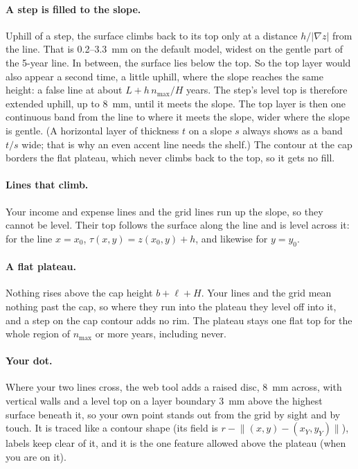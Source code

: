 \documentclass[11pt,letterpaper]{article}
\begin{document}
\paragraph{A step is filled to the slope.} Uphill of a step, the surface climbs back to its top only at a distance $h/|\nabla z|$ from the line. That is 0.2--3.3~mm on the default model, widest on the gentle part of the 5-year line. In between, the surface lies below the top. So the top layer would also appear a second time, a little uphill, where the slope reaches the same height: a false line at about $L + h\,n_{\max}/H$ years. The step's level top is therefore extended uphill, up to 8~mm, until it meets the slope. The top layer is then one continuous band from the line to where it meets the slope, wider where the slope is gentle. (A horizontal layer of thickness $t$ on a slope $s$ always shows as a band $t/s$ wide; that is why an even accent line needs the shelf.) The contour at the cap borders the flat plateau, which never climbs back to the top, so it gets no fill.

\paragraph{Lines that climb.} Your income and expense lines and the grid lines run up the slope, so they cannot be level. Their top follows the surface along the line and is level across it: for the line $x = x_0$, $\tau(x, y) = z(x_0, y) + h$, and likewise for $y = y_0$. \paragraph{A flat plateau.} Nothing rises above the cap height $b + \ell + H$. Your lines and the grid mean nothing past the cap, so where they run into the plateau they level off into it, and a step on the cap contour adds no rim. The plateau stays one flat top for the whole region of $n_{\max}$ or more years, including never. \paragraph{Your dot.} Where your two lines cross, the web tool adds a raised disc, 8~mm across, with vertical walls and a level top on a layer boundary 3~mm above the highest surface beneath it, so your own point stands out from the grid by sight and by touch. It is traced like a contour shape (its field is $r - \lVert (x, y) - (x_Y, y_Y) \rVert$), labels keep clear of it, and it is the one feature allowed above the plateau (when you are on it).
\end{document}
